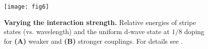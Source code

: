\documentclass[12pt]{article}
\begin{document}
\begin{figure}[htpb]
  \centering
  \texttt{[image: fig6]}
  \caption{{\bf Varying the interaction strength.} {Relative energies of stripe states (vs. wavelength) and the uniform d-wave state at $1/8$ doping for {\bf(A)} weaker and {\bf(B)} stronger couplings. For details see \cite{supplementary}.}}
  \label{fig:coupling}
\end{figure}
\end{document}
